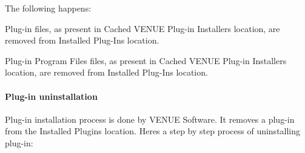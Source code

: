  The following happens\+: 
\begin{DoxyEnumerate}
\item Plug-\/in files, as present in Cached V\+E\+N\+UE Plug-\/in Installers location, are removed from Installed Plug-\/\+Ins location.  
\item Plug-\/in Program Files files, as present in Cached V\+E\+N\+UE Plug-\/in Installers location, are removed from Installed Plug-\/\+Ins location.  
\end{DoxyEnumerate}

\hypertarget{a00849_subsubsection__aax_venue_guide__system_details__plugin_installation__uninstall}{}\paragraph{Plug-\/in uninstallation}\label{a00849_subsubsection__aax_venue_guide__system_details__plugin_installation__uninstall}
 Plug-\/in installation process is done by V\+E\+N\+UE Software. It removes a plug-\/in from the Installed Plugins location. Here\textquotesingle{}s a step by step process of uninstalling plug-\/in\+: 
